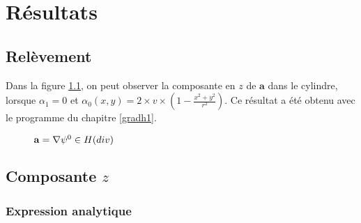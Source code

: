 \chapter{Résultats}

\section{Relèvement}
\label{respsih1}

Dans la figure \ref{az}, on peut observer la composante en $z$ de $\mathbf{a}$ dans le cylindre, lorsque $\alpha_1=0$ et $\alpha_0(x,y)=2\times v\times\left(1-\frac{x^2+y^2}{r^2}\right)$. Ce résultat a été obtenu avec le programme du chapitre \ref{gradh1}. 

\begin{figure}[H]
\makebox[\textwidth][c]{
  \subfloat{\texttt{[image: az]}}\ 
  \subfloat{\texttt{[image: az1]}}
}
\caption{$\mathbf{a}={\nabla}\psi^0\in H(div)$}
\label{az}
\end{figure}

\section{Composante $z$}

\subsection{Expression analytique}

